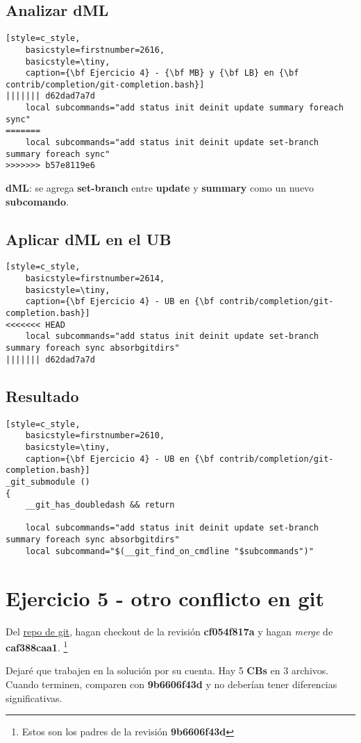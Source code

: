 \subsection*{Analizar {\bf dML}}
\begin{lstlisting}[style=c_style,
	basicstyle=firstnumber=2616,
	basicstyle=\tiny,
	caption={\bf Ejercicio 4} - {\bf MB} y {\bf LB} en {\bf contrib/completion/git-completion.bash}]
||||||| d62dad7a7d
	local subcommands="add status init deinit update summary foreach sync"
=======
	local subcommands="add status init deinit update set-branch summary foreach sync"
>>>>>>> b57e8119e6
\end{lstlisting}

{\bf dML}: se agrega {\bf set-branch} entre {\bf update} y {\bf summary} como un nuevo {\bf subcomando}.

\subsection*{Aplicar {\bf dML} en el {\bf UB}}
\begin{lstlisting}[style=c_style,
	basicstyle=firstnumber=2614,
	basicstyle=\tiny,
	caption={\bf Ejercicio 4} - UB en {\bf contrib/completion/git-completion.bash}]
<<<<<<< HEAD
	local subcommands="add status init deinit update set-branch summary foreach sync absorbgitdirs"
||||||| d62dad7a7d
\end{lstlisting}

\subsection*{Resultado}
\begin{lstlisting}[style=c_style,
	basicstyle=firstnumber=2610,
	basicstyle=\tiny,
	caption={\bf Ejercicio 4} - UB en {\bf contrib/completion/git-completion.bash}]
_git_submodule ()
{
	__git_has_doubledash && return

	local subcommands="add status init deinit update set-branch summary foreach sync absorbgitdirs"
	local subcommand="$(__git_find_on_cmdline "$subcommands")"
\end{lstlisting}


\section{Ejercicio 5 - otro conflicto en git}
\label{exercise_05}
Del \hyperref[git_repo]{repo de git}, hagan checkout de la revisión {\bf cf054f817a} y hagan {\it merge} de {\bf caf388caa1}.
\footnote{Estos son los padres de la revisión {\bf 9b6606f43d}}

Dejaré que trabajen en la solución por su cuenta. Hay 5 {\bf CBs} en 3 archivos. Cuando terminen, comparen
con {\bf 9b6606f43d} y no deberían tener diferencias significativas.
